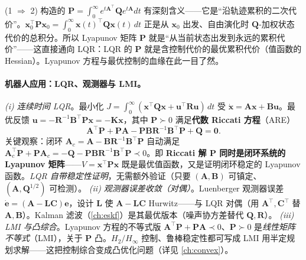 \begin{insight}
(1 $\Rightarrow$ 2) 构造的 $\mathbf{P}=\int_0^\infty e^{t\mathbf{A}^\top}\mathbf{Q}e^{t\mathbf{A}}dt$ 有深刻含义——它是“沿轨迹累积的二次代价”。$\mathbf{x}_0^\top\mathbf{P}\mathbf{x}_0=\int_0^\infty\mathbf{x}(t)^\top\mathbf{Q}\mathbf{x}(t)\,dt$ 正是从 $\mathbf{x}_0$ 出发、自由演化时 $\mathbf{Q}$-加权状态代价的总积分。所以 Lyapunov 矩阵 $\mathbf{P}$ 就是“从当前状态出发到永远的累积代价”——这直接通向 LQR：LQR 的 $\mathbf{P}$ 就是含控制代价的最优累积代价（值函数的 Hessian）。Lyapunov 方程与最优控制的血缘在此一目了然。
\end{insight}

\paragraph{机器人应用：LQR、观测器与 LMI。}
\emph{(i) 连续时间 LQR}。最小化 $J=\int_0^\infty(\mathbf{x}^\top\mathbf{Q}\mathbf{x}+\mathbf{u}^\top\mathbf{R}\mathbf{u})\,dt$ 受 $\dot{\mathbf{x}}=\mathbf{A}\mathbf{x}+\mathbf{B}\mathbf{u}$。最优反馈 $\mathbf{u}=-\mathbf{R}^{-1}\mathbf{B}^\top\mathbf{P}\mathbf{x}=-\mathbf{K}\mathbf{x}$，其中 $\mathbf{P}\succ0$ 满足\textbf{代数 Riccati 方程}（ARE）
\begin{equation}
  \mathbf{A}^\top\mathbf{P}+\mathbf{P}\mathbf{A}-\mathbf{P}\mathbf{B}\mathbf{R}^{-1}\mathbf{B}^\top\mathbf{P}+\mathbf{Q}=\mathbf{0}.
  \label{eq:are}
\end{equation}
关键观察：闭环 $\mathbf{A}_c=\mathbf{A}-\mathbf{B}\mathbf{R}^{-1}\mathbf{B}^\top\mathbf{P}$ 自动满足 $\mathbf{A}_c^\top\mathbf{P}+\mathbf{P}\mathbf{A}_c=-\mathbf{Q}-\mathbf{P}\mathbf{B}\mathbf{R}^{-1}\mathbf{B}^\top\mathbf{P}\prec0$。即 \textbf{Riccati 解 $\mathbf{P}$ 同时是闭环系统的 Lyapunov 矩阵}——$V=\mathbf{x}^\top\mathbf{P}\mathbf{x}$ 既是最优值函数，又是证明闭环稳定的 Lyapunov 函数。\emph{LQR 自带稳定性证明}，无需额外验证（只要 $(\mathbf{A},\mathbf{B})$ 可镇定、$(\mathbf{A},\mathbf{Q}^{1/2})$ 可检测）。
\emph{(ii) 观测器误差收敛（对偶）}。Luenberger 观测器误差 $\dot{\mathbf{e}}=(\mathbf{A}-\mathbf{L}\mathbf{C})\mathbf{e}$，设计 $\mathbf{L}$ 使 $\mathbf{A}-\mathbf{L}\mathbf{C}$ Hurwitz——与 LQR 对偶（用 $\mathbf{A}^\top,\mathbf{C}^\top$ 替 $\mathbf{A},\mathbf{B}$）。Kalman 滤波（\cref{ch:eskf}）是其最优版本（噪声协方差替代 $\mathbf{Q},\mathbf{R}$）。
\emph{(iii) LMI 与凸综合}。Lyapunov 方程的不等式版 $\mathbf{A}^\top\mathbf{P}+\mathbf{P}\mathbf{A}\prec0$、$\mathbf{P}\succ0$ 是\emph{线性矩阵不等式}（LMI），关于 $\mathbf{P}$ 凸。$H_2/H_\infty$ 控制、鲁棒稳定性都可写成 LMI 用半定规划求解——这把控制综合变成凸优化问题（详见 \cref{ch:convex}）。

